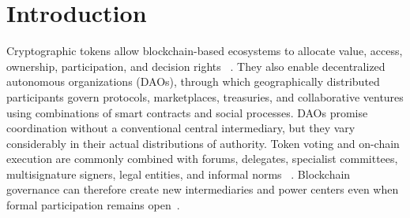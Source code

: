 \documentclass[referee,sn-basic]{sn-jnl}
\begin{document}

\maketitle

\section{Introduction}\label{sec:introduction}

Cryptographic tokens allow blockchain-based ecosystems to allocate value,
access, ownership, participation, and decision rights
~\cite{Oliviera2018,Schubert2021}. They also enable decentralized autonomous
organizations (DAOs), through which geographically distributed participants
govern protocols, marketplaces, treasuries, and collaborative ventures using
combinations of smart contracts and social processes. DAOs promise coordination
without a conventional central intermediary, but they vary considerably in
their actual distributions of authority. Token voting and on-chain execution
are commonly combined with forums, delegates, specialist committees,
multisignature signers, legal entities, and informal norms
~\cite{Alawadi2024Stewardship,Sharma2024UnpackingDAOs}. Blockchain
governance can therefore create new intermediaries and power centers even when
formal participation remains open~\cite{Feulner2025Beyond}.
\end{document}
